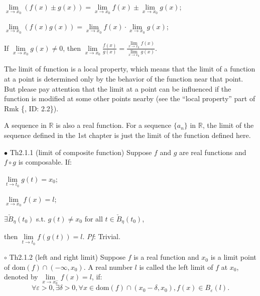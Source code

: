 \documentclass{article}
\begin{document}
\begin{Rmk}{}
{\begin{compactenum}
        \begin{compactitem}
            \item $\lim\limits_{x\rightarrow x_0} (f(x)\pm g(x)) = \lim\limits_{x\rightarrow x_0} f(x) \pm \lim\limits_{x\rightarrow x_0} g(x)$;
            \item $\lim\limits_{x\rightarrow x_0} (f(x)g(x)) = \lim\limits_{x\rightarrow x_0} f(x) \cdot \lim\limits_{x\rightarrow x_0} g(x)$;
            \item If $\lim\limits_{x\rightarrow x_0} g(x)\neq 0$, then $\lim\limits_{x\rightarrow x_0} \frac{f(x)}{g(x)} = \frac{\lim\limits_{x\rightarrow x_0} f(x)}{\lim\limits_{x\rightarrow x_0} g(x)}$.
        \end{compactitem}
        \item The limit of function is a local property, which means that the limit of a function at a point is determined only by the behavior of the function near that point. But please pay attention that the limit at a point can be influenced if the function is modified at some other points nearby (see the ``local property'' part of Rmk \{, ID: 2.2\}).
        \item A sequence in $\mathbb{R}$ is also a real function. \textcolor{Th}{For a sequence $\{a_n\}$ in $\mathbb{R}$, the limit of the sequence defined in the 1st chapter is just the limit of the function defined here.}
    \end{compactenum}}
\end{Rmk}

\begin{Th}{$\bullet$ Th2.1.1 (limit of composite function)}
    Suppose $f$ and $g$ are real functions and $f\circ g$ is composable. If:
    \begin{compactenum}
        \item $\lim\limits_{t\rightarrow t_0} g(t) = x_0$;
        \item $\lim\limits_{x\rightarrow x_0} f(x) = l$;
        \item $\exists \check{B}_\eta(t_0)$ s.t. $g(t)\neq x_0$ for all $t\in\check{B}_\eta(t_0)$,
    \end{compactenum}
    then $\lim\limits_{t\rightarrow t_0} f(g(t)) = l$.
    \tcblower
    \textit{Pf}: Trivial.
\end{Th}

\begin{Df}{$\circ$ Th2.1.2 (left and right limit)}
    Suppose $f$ is a real function and $x_0$ is a limit point of $\text{dom}(f)\cap (-\infty, x_0)$. A real number $l$ is called the left limit of $f$ at $x_0$, denoted by $\lim\limits_{x\rightarrow x_0^-}f(x) = l$, if:
    $$\forall\varepsilon>0, \exists\delta>0, \forall x\in\text{dom}(f)\cap(x_0-\delta, x_0), f(x)\in B_\varepsilon(l).$$
\end{Df}
\end{document}
